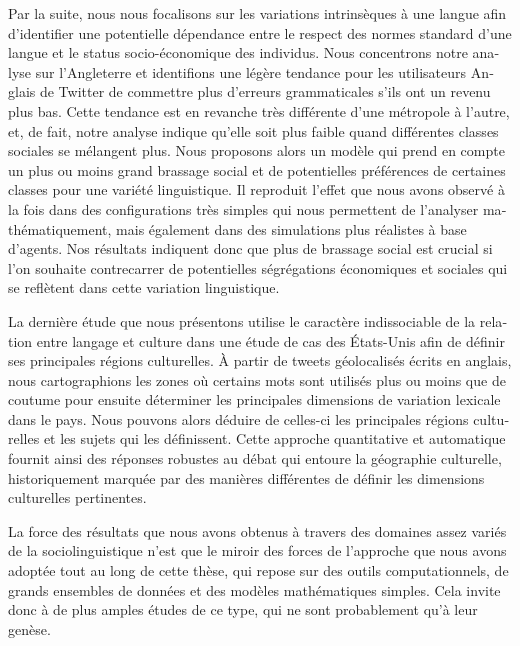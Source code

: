\documentclass[../thesis.tex]{subfiles}
\begin{document}
\begin{otherlanguage}{french}
Par la suite, nous nous focalisons sur les variations intrinsèques à une langue afin
d'identifier une potentielle dépendance entre le respect des normes standard d'une
langue et le status socio-économique des individus. Nous concentrons notre analyse sur
l'Angleterre et identifions une légère tendance pour les utilisateurs Anglais de Twitter
de commettre plus d'erreurs grammaticales s'ils ont un revenu plus bas. Cette tendance
est en revanche très différente d'une métropole à l'autre, et, de fait, notre analyse
indique qu'elle soit plus faible quand différentes classes sociales se mélangent plus.
Nous proposons alors un modèle qui prend en compte un plus ou moins grand brassage
social et de potentielles préférences de certaines classes pour une variété
linguistique. Il reproduit l'effet que nous avons observé à la fois dans des
configurations très simples qui nous permettent de l'analyser mathématiquement, mais
également dans des simulations plus réalistes à base d'agents. Nos résultats indiquent
donc que plus de brassage social est crucial si l'on souhaite contrecarrer de
potentielles ségrégations économiques et sociales qui se reflètent dans cette variation
linguistique.

La dernière étude que nous présentons utilise le caractère indissociable de la relation
entre langage et culture dans une étude de cas des États-Unis afin de définir ses
principales régions culturelles. À partir de tweets géolocalisés écrits en anglais, nous
cartographions les zones où certains mots sont utilisés plus ou moins que de coutume
pour ensuite déterminer les principales dimensions de variation lexicale dans le pays.
Nous pouvons alors déduire de celles-ci les principales régions culturelles et les
sujets qui les définissent. Cette approche quantitative et automatique fournit ainsi des
réponses robustes au débat qui entoure la géographie culturelle, historiquement marquée
par des manières différentes de définir les dimensions culturelles pertinentes.

La force des résultats que nous avons obtenus à travers des domaines assez variés de la
sociolinguistique n'est que le miroir des forces de l'approche que nous avons adoptée
tout au long de cette thèse, qui repose sur des outils computationnels, de grands
ensembles de données et des modèles mathématiques simples. Cela invite donc à de plus
amples études de ce type, qui ne sont probablement qu'à leur genèse.
\end{otherlanguage}


\clearpage
\end{document}
